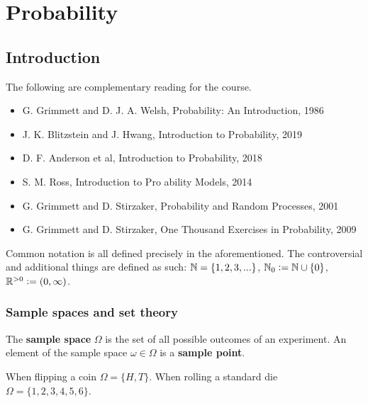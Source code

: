 \documentclass[../Year1/Year1.tex]{subfiles}
\begin{document}
\chapter{Probability}
\renewcommand*\thesection{\arabic{section}}

\section{Introduction}


The following are complementary reading for the course.
\begin{itemize}
\item G. Grimmett and D. J. A. Welsh, Probability: An Introduction, 1986
\item J. K. Blitzstein and J. Hwang, Introduction to Probability, 2019
\item D. F. Anderson et al, Introduction to Probability, 2018
\item S. M. Ross, Introduction to Pro ability Models, 2014
\item G. Grimmett and D. Stirzaker, Probability and Random Processes, 2001
\item G. Grimmett and D. Stirzaker, One Thousand Exercises in Probability, 2009
\end{itemize}

\begin{notation*}
    Common notation is all defined precisely in the aforementioned. The controversial and additional things are defined as such: $\mathbb{N} = \{1,2,3,...\}$, $\mathbb{N}_0 := \mathbb{N} \cup \{0\}$, $\mathbb{R}^{>0} := (0,\infty)$.
\end{notation*}


\subsection{Sample spaces and set theory}

\begin{definition}
    The \textbf{sample space} $\Omega$ is the set of all possible outcomes of an experiment. An element of the sample space $\omega \in \Omega$ is a \textbf{sample point}.
\end{definition}

\begin{examples}
    When flipping a coin $\Omega  = \{H,T\}$. When rolling a standard die $\Omega = \{1,2,3,4,5,6\}$.
\end{examples}
\end{document}

